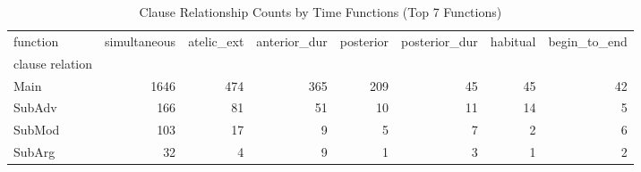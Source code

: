 \begin{table}[htbp!]
\centering
\caption{Clause Relationship Counts by Time Functions (Top 7 Functions)}
\label{table:typerel_ct}
\begin{adjustbox}{width=1\textwidth}
\begin{tabular}{lrrrrrrr}
\toprule
function &  simultaneous &  atelic\_ext &  anterior\_dur &  posterior &  posterior\_dur &  habitual &  begin\_to\_end \\
clause relation &               &             &               &            &                &           &               \\
\midrule
Main            &          1646 &         474 &           365 &        209 &             45 &        45 &            42 \\
SubAdv          &           166 &          81 &            51 &         10 &             11 &        14 &             5 \\
SubMod          &           103 &          17 &             9 &          5 &              7 &         2 &             6 \\
SubArg          &            32 &           4 &             9 &          1 &              3 &         1 &             2 \\
\bottomrule
\end{tabular}
\end{adjustbox}
\end{table}
